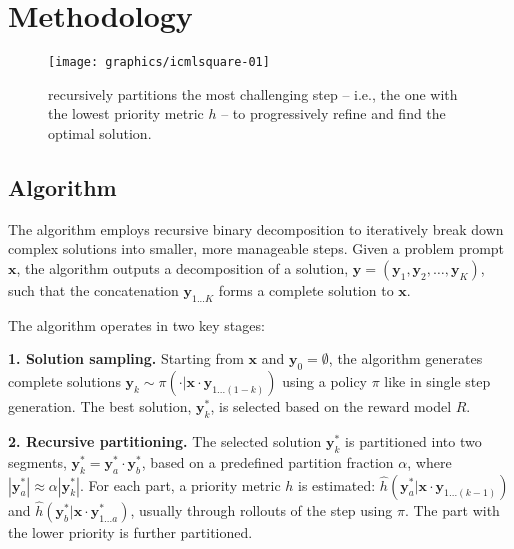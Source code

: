 \vskip -0.1in
\section{Methodology}
\begin{figure}
\vspace{-0.2cm}
    \centering
    \texttt{[image: graphics/icmlsquare-01]}
    \vskip -0.1in
    \caption{\decomp recursively partitions the most challenging step -- i.e., the one with the lowest priority metric $h$ -- to progressively refine and find the optimal solution.}
    \label{fig:recursive_partition}\vspace{-0.3cm}
\end{figure}


\subsection{\decomp Algorithm}

The \decomp algorithm employs recursive binary decomposition to iteratively break down complex solutions into smaller, more manageable steps.
Given a problem prompt $\boldsymbol{x}$, the algorithm outputs a decomposition of a solution, $\boldsymbol{y} = (\boldsymbol{y}_1, \boldsymbol{y}_2, \dots, \boldsymbol{y}_K)$, such that the concatenation $\boldsymbol{y}_{1...K}$ forms a complete solution to $\boldsymbol{x}$. 


The algorithm operates in two key stages:

\textbf{1. Solution sampling.} 
Starting from $\boldsymbol{x}$ and $\boldsymbol{y}_0 = \emptyset$, the algorithm generates complete solutions $\boldsymbol{y}_k \sim \pi(\cdot | \boldsymbol{x} \cdot \boldsymbol{y}_{1...(1-k)})$ using a policy $\pi$ like in single step generation. The best solution, $\boldsymbol{y}^*_k$, is selected based on the reward model $R$.

\textbf{2. Recursive partitioning.}
The selected solution $\boldsymbol{y}^*_k$ is partitioned into two segments, $\boldsymbol{y}^*_k = \boldsymbol{y}^*_a \cdot \boldsymbol{y}^*_b$, based on a predefined partition fraction $\alpha$, where $|\boldsymbol{y}^*_a| \approx \alpha |\boldsymbol{y}^*_k|$. For each part, a priority metric $h$ is estimated: $\hat{h}(\boldsymbol{y}^*_a | \boldsymbol{x} \cdot \boldsymbol{y}_{1...(k-1)})$ and $\hat{h}(\boldsymbol{y}^*_b | \boldsymbol{x} \cdot \boldsymbol{y}^*_{1...a})$, usually through rollouts of the step using $\pi$. The part with the lower priority is further partitioned.

